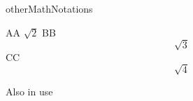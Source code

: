 
\begin{saveblock}{otherMathNotations}
	\begin{highlightblock}[gobble=8,linewidth=0.5\textwidth,
		framexleftmargin=0.25em,xleftmargin=0.25em]
		AA \(\sqrt{2}\)
		BB \[\sqrt{3}\]
		CC $$ \sqrt{4} $$
	\end{highlightblock}
\end{saveblock}

\addtorecentlist{\textbackslash [ \textellipsis\textbackslash]}

\begin{frame}{Also in use}
	\begin{columns}
		\begin{column}{0.5\textwidth}
		\end{column}
		\begin{column}{0.5\textwidth}
		\end{column}
	\end{columns}


\end{frame}
